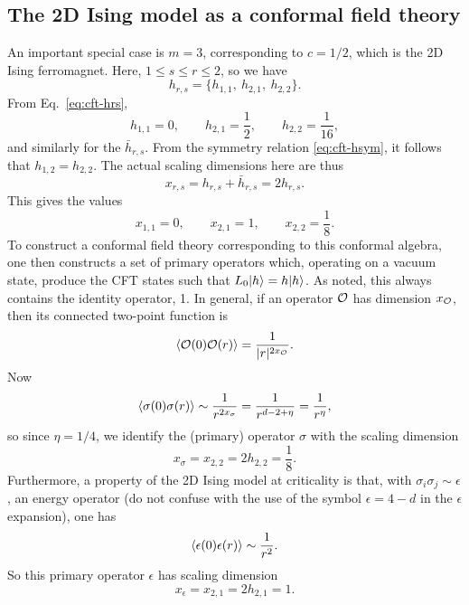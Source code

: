 \subsection{The 2D Ising model as a conformal field theory}

An important special case is $m = 3$, corresponding to $c = 1/2$, which is the 2D Ising ferromagnet. Here,
$1\le s\le r\le2$, so we have
\begin{equation}
  h_{r,s} = \{h_{1,1},\ h_{2,1},\ h_{2,2}\} .
\end{equation}
From Eq.~\eqref{eq:cft-hrs},
\begin{equation}
  h_{1,1} = 0, \qquad h_{2,1} = \frac{1}{2}, \qquad h_{2,2} = \frac{1}{16} ,
\end{equation}
and similarly for the $\bar h_{r,s}$. From the symmetry relation \eqref{eq:cft-hsym}, it follows that
$h_{1,2} = h_{2,2}$. The actual scaling dimensions here are thus
\begin{equation}
  x_{r,s} = h_{r,s}+\bar h_{r,s} = 2h_{r,s} .
\end{equation}
This gives the values
\begin{equation}
  x_{1,1} = 0, \qquad x_{2,1} = 1, \qquad x_{2,2} = \frac{1}{8} .
\end{equation}
To construct a conformal field theory corresponding to this conformal algebra, one then constructs a set of primary
operators which, operating on a vacuum state, produce the CFT states such that $L_0\lvert h\rangle = h\lvert h\rangle$. As noted, this
always contains the identity operator, 1. In general, if an operator $\mathcal{O}$ has dimension $x_{\mathcal{O}}$, then its
connected two-point function is
\begin{equation}
  \langle \mathcal{O}(0)\mathcal{O}(r)\rangle = \frac{1}{|r|^{2x_{\mathcal{O}}}} .
\end{equation}
Now
\begin{equation}
  \langle \sigma(0)\sigma(r)\rangle \sim \frac{1}{r^{2x_\sigma}} = \frac{1}{r^{d-2+\eta}} = \frac{1}{r^\eta} ,
\end{equation}
so since $\eta = 1/4$, we identify the (primary) operator $\sigma$ with the scaling dimension
\begin{equation}
  x_\sigma = x_{2,2} = 2h_{2,2} = \frac{1}{8} .
\end{equation}
Furthermore, a property of the 2D Ising model at criticality is that, with $\sigma_i\sigma_j\sim\epsilon$, an energy
operator (do not confuse with the use of the symbol $\epsilon = 4-d$ in the $\epsilon$ expansion), one has
\begin{equation}
  \langle \epsilon(0)\epsilon(r)\rangle \sim \frac{1}{r^2} .
\end{equation}
So this primary operator $\epsilon$ has scaling dimension
\begin{equation}
  x_\epsilon = x_{2,1} = 2h_{2,1} = 1 .
\end{equation}

